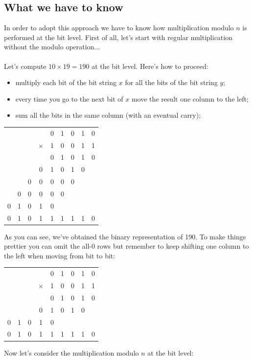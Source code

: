 \documentclass[11pt, a4paper]{article}
\begin{document}
\subsection{What we have to know}
In order to adopt this approach we have to know how multiplication modulo $n$ is performed at the bit level. First of all, let's start with regular multiplication without the modulo operation...\\\\
Let's compute $10\times19=190$ at the bit level. Here's how to proceed:
\begin{itemize}
    \item multiply each bit of the bit string $x$ for all the bits of the bit string $y$;
    \item every time you go to the next bit of $x$ move the result one column to the left;
    \item sum all the bits in the same column (with an eventual carry);
\end{itemize}
\begin{center}
    \begin{tabular}{ccccccccc}
        &&&&0&1&0&1&0\\
        &&&$\times$&1&0&0&1&1\\
        \hline
        &&&&0&1&0&1&0\\
        &&&0&1&0&1&0&\\
        &&0&0&0&0&0&&\\
        &0&0&0&0&0&&&\\
        0&1&0&1&0&&&&\\
        \hline
        0&1&0&1&1&1&1&1&0
    \end{tabular}
\end{center}
As you can see, we've obtained the binary representation of 190. To make things prettier you can omit the all-0 rows but remember to keep shifting one column to the left when moving from bit to bit:
\begin{center}
    \begin{tabular}{ccccccccc}
        &&&&0&1&0&1&0\\
        &&&$\times$&1&0&0&1&1\\
        \hline
        &&&&0&1&0&1&0\\
        &&&0&1&0&1&0&\\
        0&1&0&1&0&&&&\\
        \hline
        0&1&0&1&1&1&1&1&0
    \end{tabular}
\end{center}
Now let's consider the multiplication modulo $n$ at the bit level:
\end{document}
